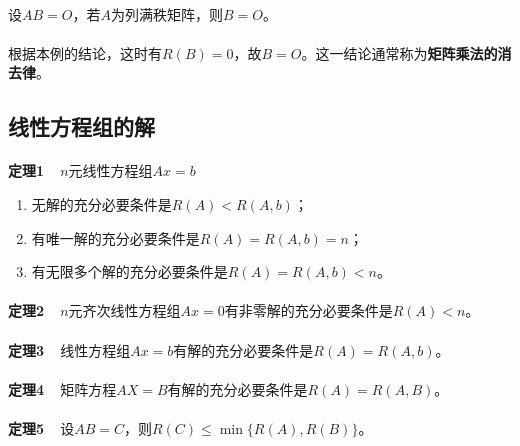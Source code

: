 \paragraph{}
设$AB=O$，若$A$为列满秩矩阵，则$B=O$。

\paragraph{}
根据本例的结论，这时有$R(B)=0$，故$B=O$。这一结论通常称为\textbf{矩阵乘法的消去律}。

\subsection{线性方程组的解}
\paragraph{}
\textbf{定理1~~}$n$元线性方程组$Ax=b$
\begin{enumerate}
  \item 无解的充分必要条件是$R(A)<R(A,b)$；
  \item 有唯一解的充分必要条件是$R(A)=R(A,b)=n$；
  \item 有无限多个解的充分必要条件是$R(A)=R(A,b)<n$。
\end{enumerate}

\paragraph{}
\textbf{定理2~~}$n$元齐次线性方程组$Ax=0$有非零解的充分必要条件是$R(A)<n$。

\paragraph{}
\textbf{定理3~~}线性方程组$Ax=b$有解的充分必要条件是$R(A)=R(A,b)$。

\paragraph{}
\textbf{定理4~~}矩阵方程$AX=B$有解的充分必要条件是$R(A)=R(A,B)$。

\paragraph{}
\textbf{定理5~~}设$AB=C$，则$R(C)\leq\min\{R(A),R(B)\}$。
